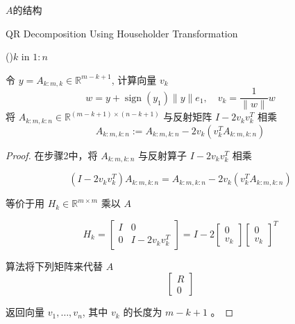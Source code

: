\begin{FigureCenter}{$A$的结构}
\end{FigureCenter}



\begin{algorithm}[htbp]
    \caption{QR Decomposition Using Householder Transformation}

    \For(){$k$ in $1:n$}{
        令 $ y=A_{k: m, k} \in \mathbb{R}^{m-k+1} $, 计算向量 $ v_{k} $
    $$ w=y+\operatorname{sign}\left(y_{1}\right)\|y\| e_{1}, \quad v_{k}=\frac{1}{\|w\|} w $$\;
    将 $ A_{k: m, k: n} \in \mathbb{R}^{(m-k+1) \times(n-k+1)} $ 与反射矩阵 $ I-2 v_{k} v_{k}^{T} $ 相乘
    $$ A_{k: m, k: n}:=A_{k: m, k: n}-2 v_{k}\left(v_{k}^{T} A_{k: m, k: n}\right) $$\;

    }
    
\end{algorithm}

\begin{proof}
    在步骤2中，将 $ A_{k: m, k: n} $ 与反射算子 $ I-2 v_{k} v_{k}^{T} $ 相乘

$$ \left(I-2 v_{k} v_{k}^{T}\right) A_{k: m, k: n}=A_{k: m, k: n}-2 v_{k}\left(v_{k}^{T} A_{k: m, k: n}\right) $$

等价于用 $ H_{k} \in \mathbb{R}^{m \times m} $ 乘以 $ A $

$$ H_{k}=\left[\begin{array}{cc}I & 0 \\ 0 & I-2 v_{k} v_{k}^{T}\end{array}\right]=I-2\left[\begin{array}{c}0 \\ v_{k}\end{array}\right]\left[\begin{array}{l}0 \\ v_{k}\end{array}\right]^{T} $$

算法将下列矩阵来代替 $ A $
$$
\left[\begin{array}{c}
R \\
0
\end{array}\right]
$$

返回向量 $ v_{1}, \ldots, v_{n} $, 其中 $ v_{k} $ 的长度为 $ m-k+1 $ 。
\end{proof}


